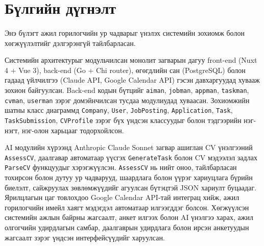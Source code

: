 

\section*{Бүлгийн дүгнэлт}

\paragraph{} Энэ бүлэгт ажил горилогчийн ур чадварыг үнэлэх системийн зохиомж болон хөгжүүлэлтийг дэлгэрэнгүй тайлбарласан.

Системийн архитектурыг модульчилсан монолит загварын дагуу front-end (Nuxt 4 + Vue 3), back-end (Go + Chi router), өгөгдлийн сан (PostgreSQL) болон гадаад үйлчилгээ (Claude API, Google Calendar API) гэсэн давхаргуудад хувааж зохион байгуулсан. Back-end кодын бүтцийг \texttt{aiman}, \texttt{jobman}, \texttt{appman}, \texttt{taskman}, \texttt{cvman}, \texttt{userman} зэрэг домэйнчилсан тусдаа модулиудад хуваасан. Зохиомжийн шатны класс диаграммд \texttt{Company}, \texttt{User}, \texttt{JobPosting}, \texttt{Application}, \texttt{Task}, \texttt{TaskSubmission}, \texttt{CVProfile} зэрэг бүх үндсэн классуудыг болон тэдгээрийн нэг-нэгт, нэг-олон харьцааг тодорхойлсон.

AI модулийн хүрээнд Anthropic Claude Sonnet загвар ашиглан CV үнэлгээний \texttt{AssessCV}, даалгавар автоматаар үүсгэх \texttt{GenerateTask} болон CV мэдээлэл задлах \texttt{ParseCV} функцуудыг хэрэгжүүлсэн. \texttt{AssessCV} нь нийт оноо, тайлбарласан тохирсон болон дутуу ур чадварууд, шаардлага болон үүрэг хариуцлага бүрийн биелэлт, сайжруулах зөвлөмжүүдийг агуулсан бүтэцтэй JSON хариулт буцаадаг. Ярилцлагын цаг товлохдоо Google Calendar API-тай интеграц хийж, ажил горилогчийн имейл хаягт мэдэгдэл автоматаар илгээгддэг болсон. Хөгжүүлсэн системийн ажлын байрны жагсаалт, анкет илгээх болон AI үнэлгээ харах, ажил олгогчийн удирдлагын самбар, даалгаврын удирдлага болон ирсэн анкетуудын жагсаалт зэрэг үндсэн интерфейсүүдийг харуулсан.
